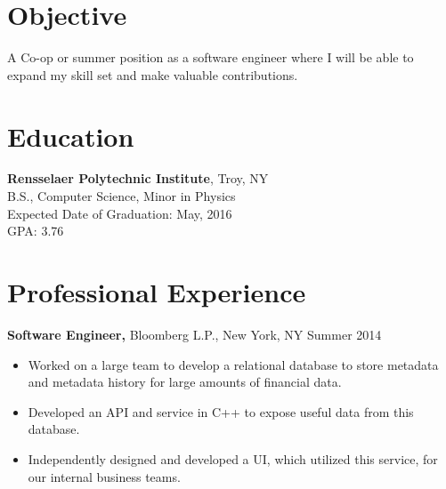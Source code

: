 \documentclass[margin]{res}
\begin{document}
 
\begin{minipage}{\textwidth}
 
 
\address{{\bf Present Address} \\ 2166 14th St \\ 2nd Floor \\ Troy, NY 12180 }
\address{{\bf Permanent Address} \\ 4 Oak Street \\ Cumberland, ME 04021 }
\begin{resume} 
 
\section{Objective} 
A Co-op or summer position as a software engineer where I will be able to expand my skill set and make valuable contributions. %

\section{Education} 
{\bf Rensselaer Polytechnic Institute}, Troy, NY \\
B.S., Computer Science, Minor in Physics \\
Expected Date of Graduation: May, 2016 \\
GPA: 3.76
 

\section{Professional Experience}
{\bf Software Engineer,} Bloomberg L.P., New York, NY \hfill Summer 2014
 \begin{itemize} \itemsep -2pt
 \item Worked on a large team to develop a relational database to store metadata and metadata history for large amounts of financial data.
 \item Developed an API and service in C++ to expose useful data from this database.
 \item Independently designed and developed a UI, which utilized this service, for our internal business teams. \\
 \end{itemize}




\end{resume}
\end{minipage}
\end{document}

